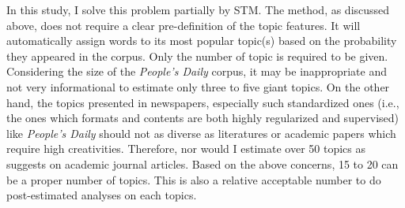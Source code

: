 \documentclass[abstracton,UTF8]{ctexart}
\begin{document}
In this study, I solve this problem partially by STM. The method, as discussed above, does not require a clear pre-definition of the topic features. It will automatically assign words to its most popular topic(s) based on the probability they appeared in the corpus. Only the number of topic is required to be given. Considering the size of the \textit{People's Daily} corpus, it may be inappropriate and not very informational to estimate only three to five giant topics. On the other hand, the topics presented in newspapers, especially such standardized ones (i.e., the ones which formats and contents are both highly regularized and supervised) like \textit{People's Daily} should not as diverse as literatures or academic papers which require high creativities. Therefore, nor would I estimate over 50 topics as \citet{Blei2012} suggests on academic journal articles. Based on the above concerns, 15 to 20 can be a proper number of topics. This is also a relative acceptable number to do post-estimated analyses on each topics.
\end{document}
